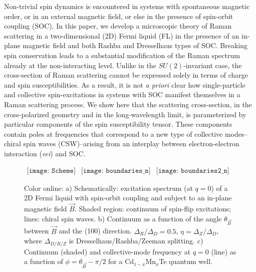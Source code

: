 \documentclass[prb,aps,twocolumn]{revtex4}
\newcommand{\bB}{{\vec B}}
\begin{document}
Non-trivial spin dynamics is encountered in systems with
spontaneous magnetic order, or in an external magnetic field, or
else in the presence of spin-orbit coupling (SOC). In this
paper, we develop a microscopic theory of Raman scattering in a
two-dimensional (2D) Fermi liquid (FL) in the presence of an
in-plane magnetic field and both Rashba \cite{Rashba} and
Dresselhaus \cite{Dresselhaus} types of SOC. Breaking spin
conservation leads to a substantial modification of the Raman
spectrum already at the non-interacting level. \cite{Magarill}
Unlike in the $SU(2)$-invariant case, the cross-section of Raman
scattering cannot be expressed solely in terms of charge and spin
susceptibilities. As a result, it is not {\em a priori} clear how
single-particle and collective spin-excitations in systems
with SOC {manifest themselves in a} Raman scattering process. We show here that the scattering cross-section, in the cross-polarized
geometry and in the long-wavelength limit, is parameterized by particular components of the spin susceptibility tensor. These components contain poles at frequencies that correspond to {a new type of collective modes--chiral spin waves (CSW)\cite{Shekhter,Ali1,Zhang,SM1,SM_damping,SM_ESR,kumar:2017}--}arising from an interplay between electron-electron interaction ({\em eei}) and {SOC}.

\begin{figure*}[htp]
$\begin{array}{ccc}
\texttt{[image: Scheme]}&
\texttt{[image: boundaries\_n]}&
\texttt{[image: boundaries2\_n]}
\end{array}$
\caption{ \label{fig:1}Color online: a) Schematically: excitation
spectrum (at $q=0$) of a 2D Fermi liquid with spin-orbit coupling
and subject to an in-plane magnetic field $\bB$. Shaded region:
continuum of spin-flip excitations; lines: chiral spin waves. b)
Continuum as a function of the angle  $\theta_\bB$ between $\bB$
and the (100) direction.  $\Delta_R/\Delta_D=0.5$,
$\eta=\Delta_Z/\Delta_D$, where $\Delta_{D/R/Z}$ is
Dresselhaus/Rashba/Zeeman splitting.  c) Continuum (shaded) and
collective-mode frequency at $q=0$ (line) as a function of
$\phi=\theta_\bB-\pi/2$ for a  Cd$_{1-x}$Mn$_{x}$Te quantum well.}
\end{figure*}
\end{document}
